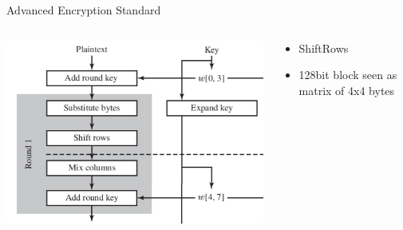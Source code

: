 \documentclass{beamer}
\begin{document}
\begin{frame}{Advanced Encryption Standard}
\begin{columns}[onlytextwidth]
    \begin{column}{0.6\textwidth}
  \begin{center}
    \includegraphics[width=1\linewidth]{AES-round}
  \end{center}
    \end{column}
    \begin{column}{0.4\textwidth}
  \begin{itemize}
  \item ShiftRows
  \item 128bit block seen as matrix of 4x4 bytes
  \end{itemize}
    \end{column}
    \end{columns}
\end{frame}
\end{document}
